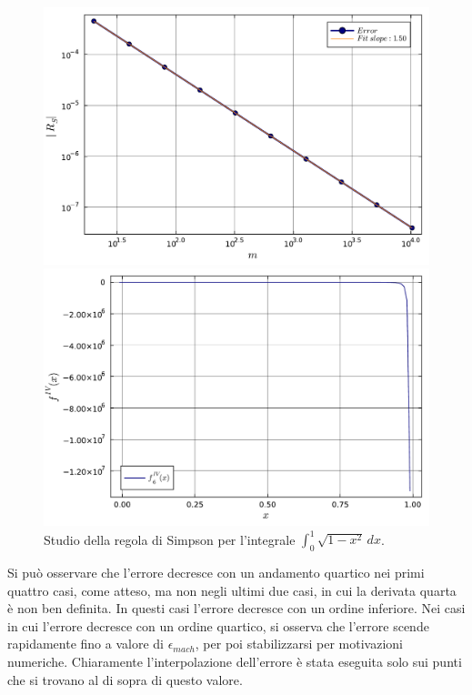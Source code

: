 \documentclass[letterpaper, 12pt]{article}
\begin{document}
\begin{figure}[!ht]
    \centering
    \begin{minipage}[b]{0.47\textwidth}
        \includegraphics[width=\textwidth]{5146.pdf}
    \end{minipage}
    \hspace{0.5cm}
    \begin{minipage}[b]{0.47\textwidth}
        \includegraphics[width=\textwidth]{5146_2.pdf}
    \end{minipage}
    \caption{Studio della regola di Simpson per l'integrale $\int_0^1 \sqrt{1-x^2}\, dx$.}
    \label{fig:es5_1_4_6}
\end{figure}

Si può osservare che l'errore decresce con un andamento quartico nei primi quattro casi, come atteso, ma non negli
ultimi due casi, in cui la derivata quarta è non ben definita. In questi casi l'errore decresce con un ordine 
inferiore. Nei casi in cui l'errore decresce con un ordine quartico, si osserva che l'errore scende rapidamente
fino a valore di $\epsilon_{mach}$, per poi stabilizzarsi per motivazioni numeriche. Chiaramente l'interpolazione
dell'errore è stata eseguita solo sui punti che si trovano al di sopra di questo valore.
\end{document}
